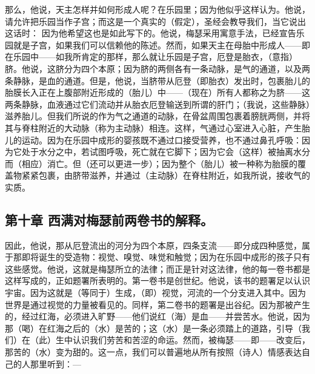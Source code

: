 那么，他说，天主怎样并如何形成人呢？在乐园里；因为他似乎这样认为。他说，请允许把乐园当作子宫；而这是一个真实的（假定），圣经会教导我们，当它说出这话时： 因为他希望这也是如此写下的。他说，梅瑟采用寓意手法，已经宣告乐园就是子宫，如果我们可以信赖他的陈述。然而，如果天主在母胎中形成人——即在乐园中——如我所肯定的那样，那么就让乐园是子宫，厄登是胎衣，（意指）脐。他说，这脐分为四个本原；因为脐的两侧各有一条动脉，是气的通道，以及两条静脉，是血的通道。但是，他说，当脐带从厄登（即胎衣）发出时，包裹胎儿的胎膜长入正在上腹部附近形成的（胎儿）中——（现在）所有人都称之为脐——这两条静脉，血液通过它们流动并从胎衣厄登输送到所谓的肝门；（我说，这些静脉）滋养胎儿。但我们所说的作为气之通道的动脉，在骨盆周围包裹着膀胱两侧，并将其与脊柱附近的大动脉（称为主动脉）相连。这样，气通过心室进入心脏，产生胎儿的运动。因为在乐园中成形的婴孩既不通过口接受营养，也不通过鼻孔呼吸：因为它处于水分之中，若试图呼吸，死亡就在它脚下；因为它会（这样）被抽离水分而（相应）消亡。但（还可以更进一步）；因为整个（胎儿）被一种称为胎膜的覆盖物紧紧包裹，由脐带滋养，并通过（主动脉）在脊柱附近，如我所说，接收气的实质。\par


\subsection{第十章 西满对梅瑟前两卷书的解释。}

因此，他说，那从厄登流出的河分为四个本原，四条支流——即分成四种感觉，属于那即将诞生的受造物：视觉、嗅觉、味觉和触觉；因为在乐园中成形的孩子只有这些感觉。他说，这就是梅瑟所立的法律；而正是针对这法律，他的每一卷书都是这样写成的，正如题署所表明的。第一卷书是创世纪。他说，该书的题署足以认识宇宙。因为这就是（等同于）生成，（即）视觉，河流的一个分支进入其中。因为世界是通过视觉的力量被看见的。同样，第二卷书的题署是出谷纪。因为那被产生的，经过红海，必须进入旷野——他们说红（海）是血——并尝苦水。他说，因为那（喝）在红海之后的（水）是苦的；这（水）是一条必须踏上的道路，引导（我们）在（此）生中认识我们劳苦和苦涩的命运。然而，被梅瑟——即——改变后，那苦的（水）变为甜的。这一点，我们可以普遍地从所有按照（诗人）情感表达自己的人那里听到：—\par

\par

